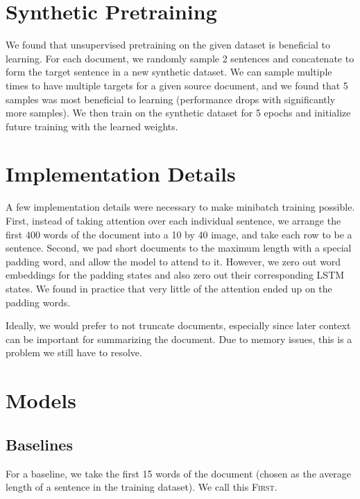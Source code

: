 \documentclass[11pt]{report}
\begin{document}

\section{Synthetic Pretraining} %

We found that unsupervised pretraining on the given dataset is beneficial to learning. For each document, we randomly sample 2 sentences and concatenate to form the target sentence in a new synthetic dataset. We can sample multiple times to have multiple targets for a given source document, and we found that 5 samples was most beneficial to learning (performance drops with significantly more samples). We then train on the synthetic dataset for 5 epochs and initialize future training with the learned weights.

\section{Implementation Details}

A few implementation details were necessary to make minibatch training possible. First, instead of taking attention over each individual sentence, we arrange the first 400 words of the document into a 10 by 40 image, and take each row to be a sentence. Second, we pad short documents to the maximum length with a special padding word, and allow the model to attend to it. However, we zero out word embeddings for the padding states and also zero out their corresponding LSTM states. We found in practice that very little of the attention ended up on the padding words.

Ideally, we would prefer to not truncate documents, especially since later context can be important for summarizing the document. Due to memory issues, this is a problem we still have to resolve.

\section{Models}

\subsection{Baselines}

For a baseline, we take the first 15 words of the document (chosen as the average length of a sentence in the training dataset). We call this \textsc{First}. 
\end{document}
